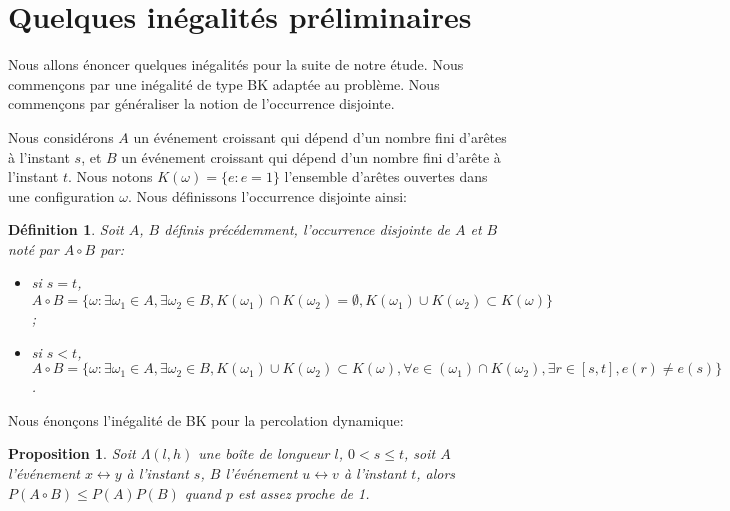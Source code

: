 \documentclass[titlepage,a4paper,12pt]{article}
\newcounter{def}
\newcounter{prop}
\newtheorem{occ}[def]{Définition}
\newtheorem{bk}[prop]{Proposition}
\begin{document}
\section{Quelques inégalités préliminaires}
Nous allons énoncer quelques inégalités pour la suite de notre étude. Nous commençons par une inégalité de type BK adaptée au problème. Nous commençons par généraliser la notion de l'occurrence disjointe.

Nous considérons $A$ un événement croissant qui dépend d'un nombre fini d'arêtes à l'instant $s$, et $B$ un événement croissant qui dépend d'un nombre fini d'arête à l'instant $t$. Nous notons $K(\omega) = \{e: e=1\}$ l'ensemble d'arêtes ouvertes dans une configuration $\omega$. Nous définissons l'occurrence disjointe ainsi:
\begin{occ}
Soit $A$, $B$ définis précédemment, l'occurrence disjointe de $A$ et $B$ noté par $A\circ B$ par:
\begin{itemize}[leftmargin=*]
\item si $s=t$, $A\circ B = \{\omega: \exists\omega_1\in A,\exists\omega_2\in B, K(\omega_1)\cap K(\omega_2) = \emptyset, K(\omega_1)\cup K(\omega_2)\subset K(\omega) \}$;
\item si $s<t$, $A\circ B = \{\omega: \exists\omega_1\in A,\exists\omega_2\in B, K(\omega_1)\cup K(\omega_2)\subset K(\omega), \forall e\in (\omega_1)\cap K(\omega_2), \exists r\in [s,t], e(r) \neq e(s) \}$.
\end{itemize}
\end{occ}
Nous énonçons l'inégalité de BK pour la percolation dynamique:


\begin{bk}
Soit $\Lambda(l,h)$ une boîte de longueur $l$, $0<s\leqslant t$, soit $A$ l'événement $x\longleftrightarrow y$ à l'instant $s$, $B$ l'événement $u\longleftrightarrow v$ à l'instant $t$, alors $P(A\circ B) \leqslant P(A)P(B)$ quand $p$ est assez proche de 1.
\end{bk}
\end{document}
